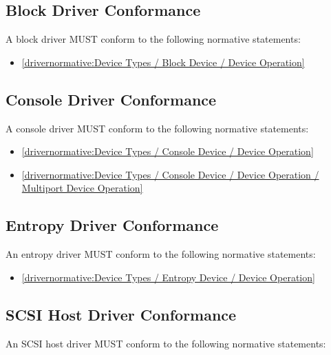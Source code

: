 \subsection{Block Driver Conformance}\label{sec:Conformance / Driver Conformance / Block Driver Conformance}

A block driver MUST conform to the following normative statements:

\begin{itemize}
\item \ref{drivernormative:Device Types / Block Device / Device Operation}
\end{itemize}

\subsection{Console Driver Conformance}\label{sec:Conformance / Driver Conformance / Console Driver Conformance}

A console driver MUST conform to the following normative statements:

\begin{itemize}
\item \ref{drivernormative:Device Types / Console Device / Device Operation}
\item \ref{drivernormative:Device Types / Console Device / Device Operation / Multiport Device Operation}
\end{itemize}

\subsection{Entropy Driver Conformance}\label{sec:Conformance / Driver Conformance / Entropy Driver Conformance}

An entropy driver MUST conform to the following normative statements:

\begin{itemize}
\item \ref{drivernormative:Device Types / Entropy Device / Device Operation}
\end{itemize}

\subsection{SCSI Host Driver Conformance}\label{sec:Conformance / Driver Conformance / SCSI Host Driver Conformance}

An SCSI host driver MUST conform to the following normative statements:

